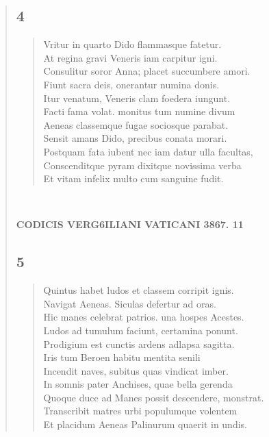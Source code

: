 \documentclass[11pt, a4paper]{report}
\begin{document}
\begin{verse}
  \subsection*{4}
      \begin{verse}
      Vritur in quarto Dido flammasque fatetur. \\ At regina gravi Veneris iam carpitur igni. \\ Consulitur soror Anna; placet succumbere amori. \\ Fiunt sacra deis, onerantur numina donis. \\ Itur venatum, Veneris clam foedera iungunt. \\ Facti fama volat. monitus tum numine divum \\ Aeneas classemque fugae sociosque parabat. \\ Sensit amans Dido, precibus conata morari. \\ Postquam fata iubent nec iam datur ulla facultas, \\ Conscenditque pyram dixitque novissima verba \\ Et vitam infelix multo cum sanguine fudit. \\ 
      \end{verse}
  
        ﻿\pagebreak 
    \begin{center} \textbf{CODICIS VERG6ILIANI VATICANI 3867. 11} \end{center}\subsection*{5}
      \begin{verse}
      Quintus habet ludos et classem corripit ignis. \\ Navigat Aeneas. Siculas defertur ad oras. \\ Hic manes celebrat patrios. una hospes Acestes. \\ Ludos ad tumulum faciunt, certamina ponunt. \\ Prodigium est cunctis ardens adlapsa sagitta. \\ Iris tum Beroen habitu mentita senili \\ Incendit naves, subitus quas vindicat imber. \\ In somnis pater Anchises, quae bella gerenda \\ Quoque duce ad Manes possit descendere, monstrat. \\ Transcribit matres urbi populumque volentem \\ Et placidum Aeneas Palinurum quaerit in undis. \\ 
      \end{verse}

\end{verse}
\end{document}
